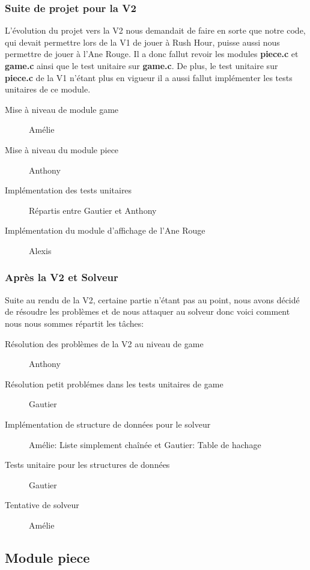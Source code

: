 \documentclass{report}
\begin{document}
\subsubsection*{Suite de projet pour la V2}
L'évolution du projet vers la V2 nous demandait de faire en sorte que notre code, qui devait permettre lors de la V1 de jouer à Rush Hour, puisse aussi nous permettre de jouer à l'Ane Rouge. Il a donc fallut revoir les modules \textbf{piece.c} et \textbf{game.c} ainsi que le test unitaire sur \textbf{game.c}. De plus, le test unitaire sur \textbf{piece.c} de la V1 n'étant plus en vigueur il a aussi fallut implémenter les tests unitaires de ce module.
\begin{description}
\item [Mise à niveau de module game] Amélie
\item [Mise à niveau du module piece] Anthony
\item [Implémentation des tests unitaires] Répartis entre Gautier et Anthony
\item [Implémentation du module d'affichage de l'Ane Rouge] Alexis
\end{description}

\subsubsection*{Après la V2 et Solveur}
Suite au rendu de la V2, certaine partie n'étant pas au point, nous avons décidé de résoudre les problèmes et de nous attaquer au solveur donc voici comment nous nous sommes répartit les tâches:

\begin{description}
\item [Résolution des problèmes de la V2 au niveau de game] Anthony
\item [Résolution petit problémes dans les tests unitaires de game] Gautier
\item [Implémentation de structure de données pour le solveur] Amélie: Liste simplement chaînée et Gautier: Table de hachage
\item [Tests unitaire pour les structures de données] Gautier
\item[Tentative de solveur]Amélie
\end{description}

\subsection{Module piece}
\end{document}

